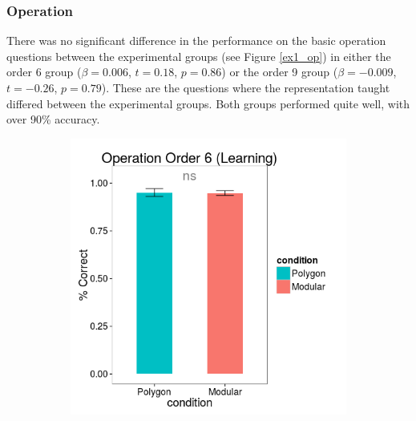 \documentclass[11pt]{article}
\begin{document}
\subsubsection{Operation}
There was no significant difference in the performance on the basic operation questions between the experimental groups (see Figure \ref{ex1_op}) in either the order 6 group ($\beta = 0.006$, $t = 0.18$, $p = 0.86$) or the order 9 group ($\beta = -0.009$, $t = -0.26$, $p = 0.79$). These are the questions where the representation taught differed between the experimental groups. Both groups performed quite well, with over 90\% accuracy. 
\begin{figure}[H]
\centering
\begin{subfigure}[c]{0.4\textwidth}
\centering
\includegraphics[width=\textwidth]{figures/1/op_6_r.png}
\end{subfigure}
~
\begin{subfigure}[c]{0.4\textwidth}
\centering

\end{subfigure}
\end{figure}
\end{document}
